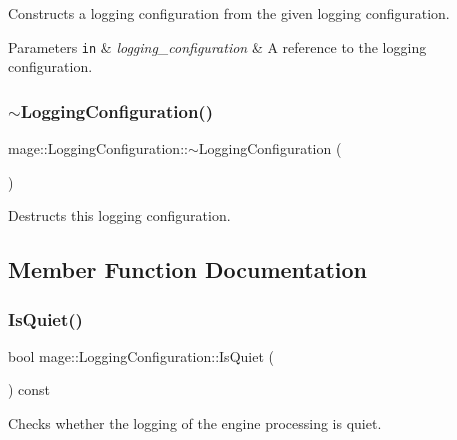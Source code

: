 Constructs a logging configuration from the given logging configuration.


\begin{DoxyParams}[1]{Parameters}
\mbox{\tt in}  & {\em logging\+\_\+configuration} & A reference to the logging configuration. \\
\hline
\end{DoxyParams}
\hypertarget{structmage_1_1_logging_configuration_a842cd1d5cf22c9fb6e2c76e684cd08ee}{}\label{structmage_1_1_logging_configuration_a842cd1d5cf22c9fb6e2c76e684cd08ee} 
\subsubsection{\texorpdfstring{$\sim$\+Logging\+Configuration()}{~LoggingConfiguration()}}
{\footnotesize\ttfamily mage\+::\+Logging\+Configuration\+::$\sim$\+Logging\+Configuration (\begin{DoxyParamCaption}{ }\end{DoxyParamCaption})\hspace{0.3cm}{\ttfamily [default]}}

Destructs this logging configuration. 

\subsection{Member Function Documentation}
\hypertarget{structmage_1_1_logging_configuration_ac081313b7a9440bcd73b6a9b69ff3452}{}\label{structmage_1_1_logging_configuration_ac081313b7a9440bcd73b6a9b69ff3452} 
\subsubsection{\texorpdfstring{Is\+Quiet()}{IsQuiet()}}
{\footnotesize\ttfamily bool mage\+::\+Logging\+Configuration\+::\+Is\+Quiet (\begin{DoxyParamCaption}{ }\end{DoxyParamCaption}) const}

Checks whether the logging of the engine processing is quiet.

